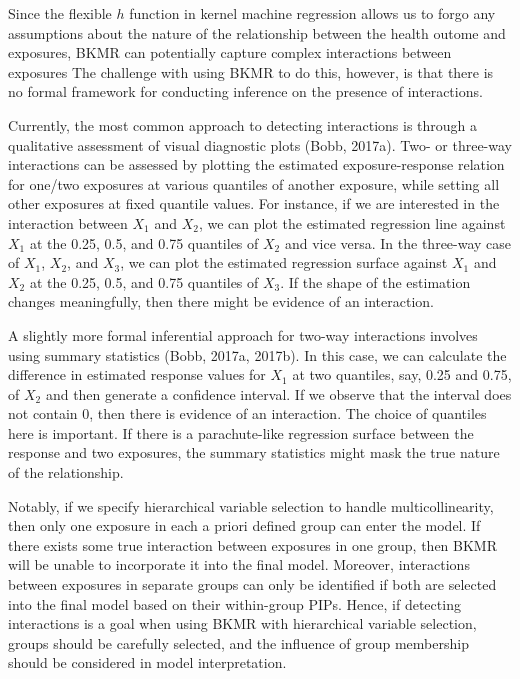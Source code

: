 \documentclass[12pt, twoside]{amherstthesis}
\begin{document}
Since the flexible \(h\) function in kernel machine regression allows us to forgo any assumptions about the nature of the relationship between the health outome and exposures, BKMR can potentially capture complex interactions between exposures The challenge with using BKMR to do this, however, is that there is no formal framework for conducting inference on the presence of interactions.

Currently, the most common approach to detecting interactions is through a qualitative assessment of visual diagnostic plots (Bobb, 2017a). Two- or three-way interactions can be assessed by plotting the estimated exposure-response relation for one/two exposures at various quantiles of another exposure, while setting all other exposures at fixed quantile values. For instance, if we are interested in the interaction between \(X_1\) and \(X_2\), we can plot the estimated regression line against \(X_1\) at the 0.25, 0.5, and 0.75 quantiles of \(X_2\) and vice versa. In the three-way case of \(X_1\), \(X_2\), and \(X_3\), we can plot the estimated regression surface against \(X_1\) and \(X_2\) at the 0.25, 0.5, and 0.75 quantiles of \(X_3\). If the shape of the estimation changes meaningfully, then there might be evidence of an interaction.

A slightly more formal inferential approach for two-way interactions involves using summary statistics (Bobb, 2017a, 2017b). In this case, we can calculate the difference in estimated response values for \(X_1\) at two quantiles, say, 0.25 and 0.75, of \(X_2\) and then generate a confidence interval. If we observe that the interval does not contain 0, then there is evidence of an interaction. The choice of quantiles here is important. If there is a parachute-like regression surface between the response and two exposures, the summary statistics might mask the true nature of the relationship.

Notably, if we specify hierarchical variable selection to handle multicollinearity, then only one exposure in each a priori defined group can enter the model. If there exists some true interaction between exposures in one group, then BKMR will be unable to incorporate it into the final model. Moreover, interactions between exposures in separate groups can only be identified if both are selected into the final model based on their within-group PIPs. Hence, if detecting interactions is a goal when using BKMR with hierarchical variable selection, groups should be carefully selected, and the influence of group membership should be considered in model interpretation.
\end{document}
